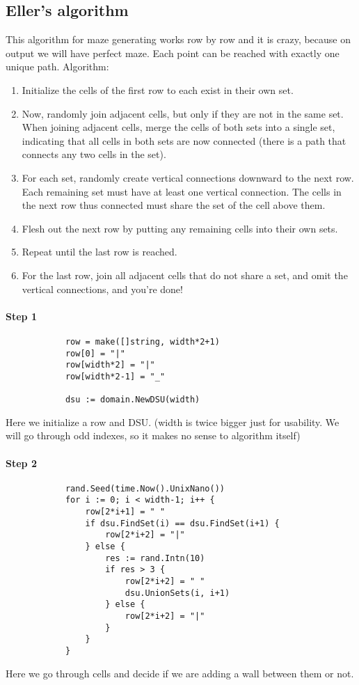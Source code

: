 		\subsection{Eller's algorithm}
		This algorithm \cite{Eller} for maze generating works row by row and it is crazy, because on output we will have perfect maze. Each point can be reached with exactly one unique path.
		Algorithm:
		
		\begin{enumerate}
			\item Initialize the cells of the first row to each exist in their own set.
			\item Now, randomly join adjacent cells, but only if they are not in the same set. When joining adjacent cells, merge the cells of both sets into a single set, indicating that all cells in both sets are now connected (there is a path that connects any two cells in the set).
			\item For each set, randomly create vertical connections downward to the next row. Each remaining set must have at least one vertical connection. The cells in the next row thus connected must share the set of the cell above them.
			\item Flesh out the next row by putting any remaining cells into their own sets.
			\item Repeat until the last row is reached.
			\item For the last row, join all adjacent cells that do not share a set, and omit the vertical connections, and you’re done!
		\end{enumerate}
		
		\paragraph{Step 1}
		
		\begin{lstlisting}
			row = make([]string, width*2+1)
			row[0] = "|"
			row[width*2] = "|"
			row[width*2-1] = "_"

			dsu := domain.NewDSU(width)
		\end{lstlisting}
		
		Here we initialize a row and DSU. (width is twice bigger just for usability. We will go through odd indexes, so it makes no sense to algorithm itself)
		
		\paragraph{Step 2}
		\begin{lstlisting}
			rand.Seed(time.Now().UnixNano())
			for i := 0; i < width-1; i++ {
				row[2*i+1] = " "
				if dsu.FindSet(i) == dsu.FindSet(i+1) {
					row[2*i+2] = "|"
				} else {
					res := rand.Intn(10)
					if res > 3 {
						row[2*i+2] = " "
						dsu.UnionSets(i, i+1)
					} else {
						row[2*i+2] = "|"
					}
				}
			}
		\end{lstlisting}
		Here we go through cells and decide if we are adding a wall between them or not.
		
